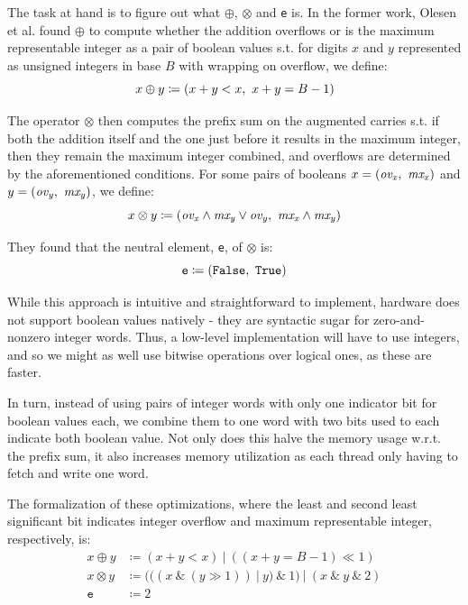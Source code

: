 The task at hand is to figure out what $\oplus$, $\otimes$ and \texttt{e} is. In the former
work, Olesen et al. found $\oplus$ to compute whether the addition overflows or is
the maximum representable integer as a pair of boolean values s.t. for digits
$x$ and $y$ represented as unsigned integers in base $B$ with wrapping on
overflow, we define:
\begin{equation}
\label{eq:oplus}
x \oplus y \coloneq (x + y < x,~x + y = B-1)
\end{equation}

The operator $\otimes$ then computes the prefix sum on the augmented carries s.t. if
both the addition itself and the one just before it results in the maximum
integer, then they remain the maximum integer combined, and overflows are
determined by the aforementioned conditions. For some pairs of booleans
$x = (\mathit{ov_x},~\mathit{mx_{x}})$ and
$y = (\mathit{ov_y},~\mathit{mx_{y}})$, we define:
\begin{equation}
  \label{eq:otimes}
  x \otimes y \coloneq (\mathit{ov_x} \land \mathit{mx_y} \lor \mathit{ov_y},~\mathit{mx_x} \land \mathit{mx_y})
\end{equation}

They found that the neutral element, \texttt{e}, of $\otimes$ is:
\begin{equation}
  \label{eq:otimesne}
  \mathtt{e} \coloneq (\mathtt{False},~\mathtt{True})
\end{equation}

While this approach is intuitive and straightforward to implement, hardware does
not support boolean values natively - they are syntactic sugar for
zero-and-nonzero integer words. Thus, a low-level implementation will have to
use integers, and so we might as well use bitwise operations over logical ones, as
these are faster.

In turn, instead of using pairs of integer words with only one indicator bit for
boolean values each, we combine them to one word with two bits used to each
indicate both boolean value. Not only does this halve the memory usage
w.r.t. the prefix sum, it also increases memory utilization as each thread
only having to fetch and write one word.

The formalization of these optimizations, where the least and second least
significant bit indicates integer overflow and maximum representable integer,
respectively, is:
\begin{align}
  \label{eq:oplusopt}
  x \oplus y &\coloneq (x + y < x)~|~((x + y = B-1) \ll 1) \\
  \label{eq:otimesopt}
  x \otimes y &\coloneq (((x~\&~(y \gg 1))~|~y)~\&~1)~|~(x~\&~y~\&~2)\\
  \label{eq:otimesneopt}
  \mathtt{e} &\coloneq 2
\end{align}

